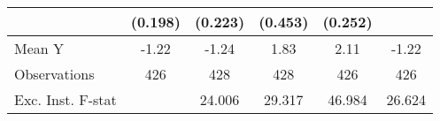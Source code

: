 {\begin{tabular}{l*{5}{c}}
            &     (0.198)         &     (0.223)         &     (0.453)         &     (0.252)         &                     \\
\midrule
Mean Y      &       -1.22         &       -1.24         &        1.83         &        2.11         &       -1.22         \\
Observations&         426         &         428         &         428         &         426         &         426         \\
Exc. Inst. F-stat&                     &      24.006         &      29.317         &      46.984         &      26.624         \\
\bottomrule
\end{tabular}
}
